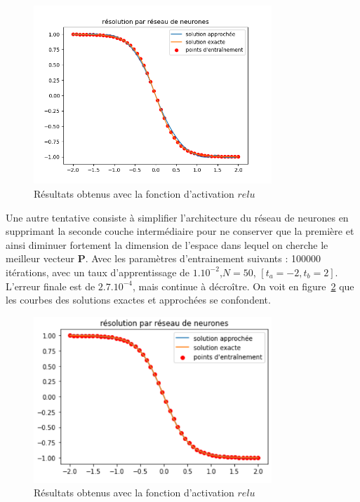 \documentclass[12pt]{report}
\begin{document}
\begin{figure}
    \centering
    \includegraphics[width=0.8\textwidth]{direct_relu_0_001_10000_32_16_v2.png}
    \caption{Résultats obtenus avec la fonction d'activation $relu$}
    \label{fig:relu_apprentissage_direct}
\end{figure}

Une autre tentative consiste à simplifier l'architecture du réseau de neurones en supprimant la seconde couche intermédiaire pour ne conserver que la première et ainsi diminuer fortement la dimension de l'espace dans lequel on cherche le meilleur vecteur $\bm P$. Avec les paramètres d'entrainement suivants : 100000 itérations, avec un taux d'apprentissage de $1.10^{-2}$,$N=50$, $[t_a = -2, t_b = 2]$.
L'erreur finale est de $2.7.10^{-4}$, mais continue à décroître.
On voit en figure~\ref{fig:Mz_sigmoid_1_couche} que les courbes des solutions exactes et approchées se confondent.

\begin{figure}
    \centering
    \includegraphics[width=0.8\textwidth]{Mz_50000_epochs_1_couche.PNG}
    \caption{Résultats obtenus avec la fonction d'activation $relu$}
    \label{fig:Mz_sigmoid_1_couche}
\end{figure}
\end{document}
